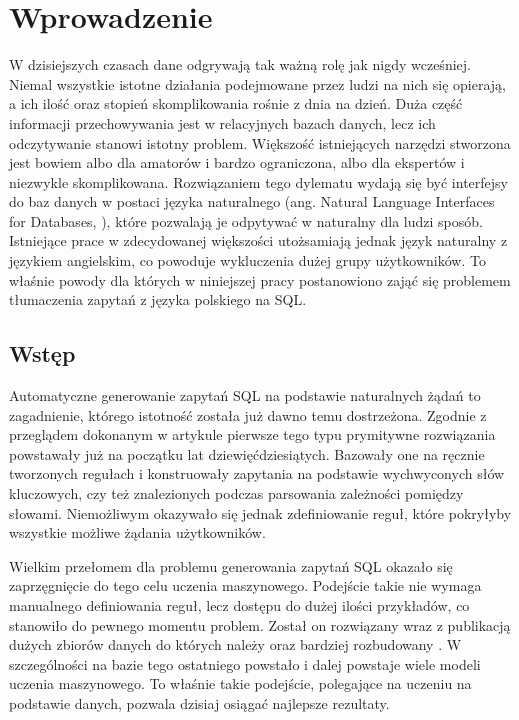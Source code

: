 \chapter{Wprowadzenie}
W dzisiejszych czasach dane odgrywają tak ważną rolę jak nigdy wcześniej.  Niemal wszystkie istotne działania podejmowane przez ludzi na nich się opierają, a ich ilość oraz stopień skomplikowania rośnie z dnia na dzień. Duża część informacji przechowywania jest w relacyjnych bazach danych, lecz ich odczytywanie stanowi istotny problem. Większość istniejących narzędzi stworzona jest bowiem albo dla amatorów i bardzo ograniczona, albo dla ekspertów i niezwykle skomplikowana. Rozwiązaniem tego dylematu wydają się być interfejsy do baz danych w postaci języka naturalnego (ang. Natural Language Interfaces for Databases, ), które pozwalają je odpytywać w naturalny dla ludzi sposób. Istniejące prace w zdecydowanej większości utożsamiają jednak język naturalny z językiem angielskim, co powoduje wykluczenia dużej grupy użytkowników. To właśnie powody dla których w niniejszej pracy postanowiono zająć się problemem tłumaczenia zapytań z języka polskiego na SQL. 

\section{Wstęp}
Automatyczne generowanie zapytań SQL na podstawie naturalnych żądań to zagadnienie, którego istotność została już dawno temu dostrzeżona. Zgodnie z przeglądem dokonanym w artykule  \cite{Quamar2022NaturalInterfacesBook} pierwsze tego typu prymitywne rozwiązania powstawały już na początku lat dziewięćdziesiątych. Bazowały one na ręcznie tworzonych regułach i konstruowały zapytania na podstawie wychwyconych słów kluczowych, czy też znalezionych podczas parsowania zależności pomiędzy słowami. Niemożliwym okazywało się jednak zdefiniowanie reguł, które pokryłyby wszystkie możliwe żądania użytkowników.

Wielkim przełomem dla problemu generowania zapytań SQL okazało się zaprzęgnięcie do tego celu uczenia maszynowego. Podejście takie nie wymaga manualnego definiowania reguł, lecz dostępu do dużej ilości przykładów, co stanowiło do pewnego momentu problem. Został on rozwiązany wraz z publikacją dużych zbiorów danych do których należy  \cite{Zhong2017} oraz bardziej rozbudowany  \cite{Yu2018spider}. W szczególności na bazie tego ostatniego powstało i dalej powstaje wiele modeli uczenia maszynowego. To właśnie takie podejście, polegające na uczeniu na podstawie danych, pozwala dzisiaj osiągać najlepsze rezultaty.

